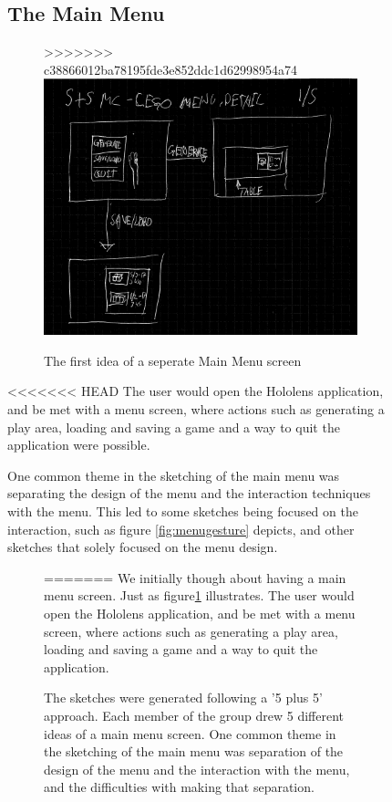 \begin{figure}[h]
\subsection{The Main Menu}
\begin{figure}[t]
>>>>>>> c38866012ba78195fde3e852ddc1d62998954a74
	\centering
	\includegraphics[width=0.7\linewidth]{figures/Menu/menu8}
	\caption{The first idea of a seperate Main Menu screen}
	\label{fig:menu8}
\end{figure}
<<<<<<< HEAD
The user would open the Hololens application, and be met with a menu screen, where actions such as generating a play area, loading and saving a game and a way to quit the application were possible. \par
One common theme in the sketching of the main menu was separating the design of the menu and the interaction techniques with the menu. This led to some sketches being focused on the interaction, such as figure \ref{fig:menugesture} depicts, and other sketches that solely focused on the menu design.\par
\begin{figure}[h]
=======
We initially though about having a main menu screen. Just as figure\ref{fig:menu8} illustrates. The user would open the Hololens application, and be met with a menu screen, where actions such as generating a play area, loading and saving a game and a way to quit the application. \par
The sketches were generated following a '5 plus 5' approach. Each member of the group drew 5 different ideas of a main menu screen. One common theme in the sketching of the main menu was separation of the design of the menu and the interaction with the menu, and the difficulties with making that separation.\par
\begin{figure}[t]

\end{figure}
\end{figure}
\end{figure}
